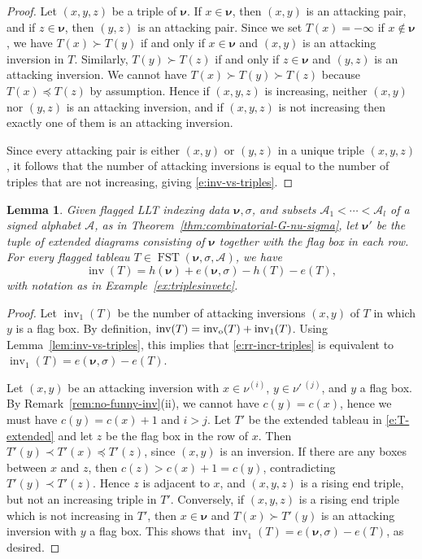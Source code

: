 \documentclass[12pt]{amsart}
\newtheorem{lemma}[thm]{Lemma}
\theoremstyle{definition}
\theoremstyle{remark}
\newcommand{\nubold}{{\boldsymbol \nu }}
\newcommand{\Acal}{{\mathcal A}}
\newcommand{\sgngt}{\succ}
\newcommand{\sgnlt}{\prec}
\newcommand{\sgnle}{\preccurlyeq}
\DeclareMathOperator{\inv}{inv}
\newcommand{\oinv}{\inv _{{\rm o}}}
\DeclareMathOperator{\FSST}{FST}
\begin{document}
\begin{proof}
Let $(x,y,z)$ be a triple of $\nubold $.  If $x\in \nubold $, then
$(x,y)$ is an attacking pair, and if $z\in \nubold $, then $(y,z)$ is
an attacking pair.  Since we set $T(x) = -\infty $ if $x\not \in
\nubold $, we have $T(x) \sgngt T(y)$ if and only if $x\in \nubold $
and $(x,y)$ is an attacking inversion in $T$.  Similarly, $T(y) \sgngt
T(z)$ if and only if $z\in \nubold $ and $(y,z)$ is an attacking
inversion.  We cannot have $T(x) \sgngt T(y) \sgngt T(z)$ because
$T(x) \sgnle T(z)$ by assumption.  Hence if $(x,y,z)$ is increasing,
neither $(x,y)$ nor $(y,z)$ is an attacking inversion, and if
$(x,y,z)$ is not increasing then exactly one of them is an attacking
inversion.

Since every attacking pair is either $(x,y)$ or $(y,z)$ in a unique
triple $(x,y,z)$, it follows that the number of attacking inversions
is equal to the number of triples that are not increasing, giving
\eqref{e:inv-vs-triples}.
\end{proof}


\begin{lemma}\label{lem:rr-incr-triples}
Given flagged LLT indexing data $\nubold ,\sigma $, and subsets $\Acal
_{1}<\cdots <\Acal _{l}$ of a signed alphabet $\Acal $, as in
Theorem~\ref{thm:combinatorial-G-nu-sigma}, let $\nubold '$ be the
tuple of extended diagrams consisting of $\nubold $ together with the
flag box in each row.  For every flagged tableau $T\in \FSST (\nubold
, \sigma , \Acal )$, we have
\begin{equation}\label{e:rr-incr-triples}
\inv (T) = h(\nubold ) + e(\nubold ,\sigma ) - h(T) - e(T),
\end{equation}
with notation as in Example~\ref{ex:triplesinvetc}.
\end{lemma}

\begin{proof}
Let $\inv _{1}(T)$ be the number of attacking inversions $(x,y)$ of
$T$ in which $y$ is a flag box.  By definition, $\inv (T) = \oinv (T)
+ \inv _{1}(T)$.  Using Lemma~\ref{lem:inv-vs-triples}, this implies
that \eqref{e:rr-incr-triples} is equivalent to $\inv _{1}(T) =
e(\nubold ,\sigma ) - e(T)$.

Let $(x,y)$ be an attacking inversion with $x\in \nu ^{(i)}$, $y\in
\nu '\, ^{(j)}$, and $y$ a flag box.  By
Remark~\ref{rem:no-funny-inv}(ii), we cannot have $c(y) = c(x)$, hence
we must have $c(y)= c(x)+1$ and $i>j$.  Let $T'$ be the extended
tableau in \eqref{e:T-extended} and let $z$ be the flag box in the row
of $x$.  Then $T'(y) \sgnlt T'(x) \sgnle T'(z)$, since $(x,y)$ is an
inversion.  If there are any boxes between $x$ and $z$, then
$c(z)>c(x)+1 = c(y)$, contradicting $T'(y) \sgnlt T'(z)$.  Hence $z$
is adjacent to $x$, and $(x,y,z)$ is a rising end triple, but not an
increasing triple in $T'$.  Conversely, if $(x,y,z)$ is a rising end
triple which is not increasing in $T'$, then $x\in \nubold $ and $T(x)
\sgngt T'(y)$ is an attacking inversion with $y$ a flag box.  This
shows that $\inv _{1}(T) = e(\nubold ,\sigma ) - e(T)$, as desired.
\end{proof}
\end{document}
